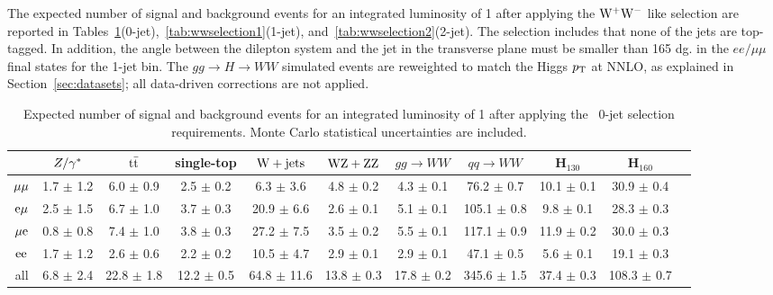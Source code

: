The expected number of signal and background events for an integrated 
luminosity of 1\ifb{} after applying the $\mathrm{W}^+\mathrm{W}^-$ like selection are reported in 
Tables~\ref{tab:wwselection0}(0-jet),~\ref{tab:wwselection1}(1-jet), 
and~\ref{tab:wwselection2}(2-jet). The selection includes that none of the 
jets are top-tagged. In addition, the angle between the dilepton 
system and the jet in the transverse plane must be smaller than 165 dg. in 
the $ee/\mu\mu$ final states for the 1-jet bin. The $gg \to H \to WW$ 
simulated events are reweighted to match the Higgs $p_\mathrm{T}$ at NNLO, as explained 
in Section~\ref{sec:datasets}; all data-driven corrections are not applied.

\begin{table}[!ht]
  \begin{center}
 {\scriptsize
  \begin{tabular} {|c|c|c|c|c|c|c|c|c|c|c|}
\hline
 & $Z/\gamma^*$ & $\mathrm{t}\bar{\mathrm{t}}$ & single-top & $\mathrm{W+jets}$ & $\mathrm{W}\mathrm{Z}+\mathrm{Z}\mathrm{Z}$ & $gg \to WW$ & $qq \to WW$ & H$_{130}$ &   H$_{160}$ \\
  \hline
  \hline
  $\mu\mu$   &  1.7 $\pm$   1.2 &  6.0 $\pm$   0.9 &  2.5 $\pm$   0.2 &  6.3 $\pm$   3.6& 4.8   $\pm$	0.2 &  4.3 $\pm$	0.1 & 76.2 $\pm$	0.7 & 10.1 $\pm$	0.1 & 30.9 $\pm$	0.4\\
  $\mathrm{e}\mu$   &  2.5 $\pm$   1.5 &  6.7 $\pm$   1.0 &  3.7 $\pm$   0.3 & 20.9 $\pm$   6.6& 2.6   $\pm$	0.1 &  5.1 $\pm$	0.1 &105.1 $\pm$	0.8 &  9.8 $\pm$	0.1 & 28.3 $\pm$	0.3\\
  $\mu\mathrm{e}$   &  0.8 $\pm$   0.8 &  7.4 $\pm$   1.0 &  3.8 $\pm$   0.3 & 27.2 $\pm$   7.5& 3.5   $\pm$	0.2 &  5.5 $\pm$	0.1 &117.1 $\pm$	0.9 & 11.9 $\pm$	0.2 & 30.0 $\pm$	0.3\\
  $\mathrm{e}\mathrm{e}$   &  1.7 $\pm$   1.2 &  2.6 $\pm$   0.6 &  2.2 $\pm$   0.2 & 10.5 $\pm$   4.7& 2.9   $\pm$	0.1 &  2.9 $\pm$	0.1 & 47.1 $\pm$	0.5 &  5.6 $\pm$	0.1 & 19.1 $\pm$	0.3\\
  \hline
       all &  6.8 $\pm$   2.4 & 22.8 $\pm$   1.8 & 12.2 $\pm$   0.5 & 64.8 $\pm$  11.6& 13.8  $\pm$	0.3 & 17.8 $\pm$	0.2 &345.6 $\pm$	1.5 & 37.4 $\pm$	0.3 &108.3 $\pm$	0.7\\
 \hline
  \end{tabular}
  }
  \caption{Expected number of signal and background events for an 
  integrated luminosity of 1\ifb{} after applying the \ww\ 
  0-jet selection requirements. Monte Carlo statistical 
  uncertainties are included.}
   \label{tab:wwselection0}
  \end{center}
\end{table}

